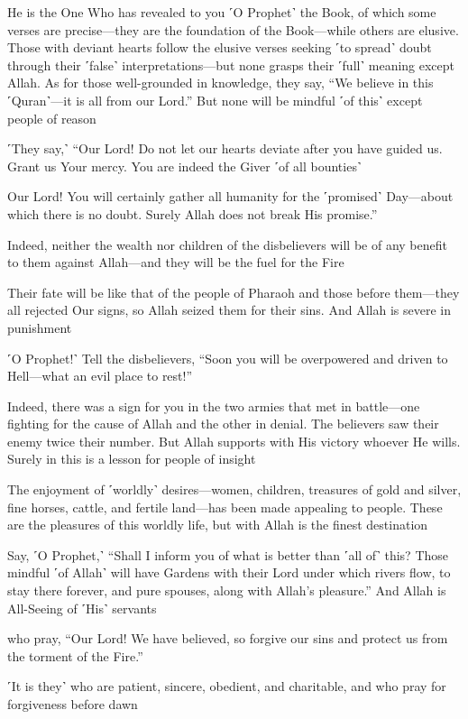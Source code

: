 He is the One Who has revealed to you ˹O Prophet˺ the Book, of which some verses are precise—they are the foundation of the Book—while others are elusive. Those with deviant hearts follow the elusive verses seeking ˹to spread˺ doubt through their ˹false˺ interpretations—but none grasps their ˹full˺ meaning except Allah. As for those well-grounded in knowledge, they say, “We believe in this ˹Quran˺—it is all from our Lord.” But none will be mindful ˹of this˺ except people of reason

˹They say,˺ “Our Lord! Do not let our hearts deviate after you have guided us. Grant us Your mercy. You are indeed the Giver ˹of all bounties˺

Our Lord! You will certainly gather all humanity for the ˹promised˺ Day—about which there is no doubt. Surely Allah does not break His promise.”

Indeed, neither the wealth nor children of the disbelievers will be of any benefit to them against Allah—and they will be the fuel for the Fire

Their fate will be like that of the people of Pharaoh and those before them—they all rejected Our signs, so Allah seized them for their sins. And Allah is severe in punishment

˹O Prophet!˺ Tell the disbelievers, “Soon you will be overpowered and driven to Hell—what an evil place to rest!”

Indeed, there was a sign for you in the two armies that met in battle—one fighting for the cause of Allah and the other in denial. The believers saw their enemy twice their number. But Allah supports with His victory whoever He wills. Surely in this is a lesson for people of insight

The enjoyment of ˹worldly˺ desires—women, children, treasures of gold and silver, fine horses, cattle, and fertile land—has been made appealing to people. These are the pleasures of this worldly life, but with Allah is the finest destination

Say, ˹O Prophet,˺ “Shall I inform you of what is better than ˹all of˺ this? Those mindful ˹of Allah˺ will have Gardens with their Lord under which rivers flow, to stay there forever, and pure spouses, along with Allah’s pleasure.” And Allah is All-Seeing of ˹His˺ servants

who pray, “Our Lord! We have believed, so forgive our sins and protect us from the torment of the Fire.”

˹It is they˺ who are patient, sincere, obedient, and charitable, and who pray for forgiveness before dawn

